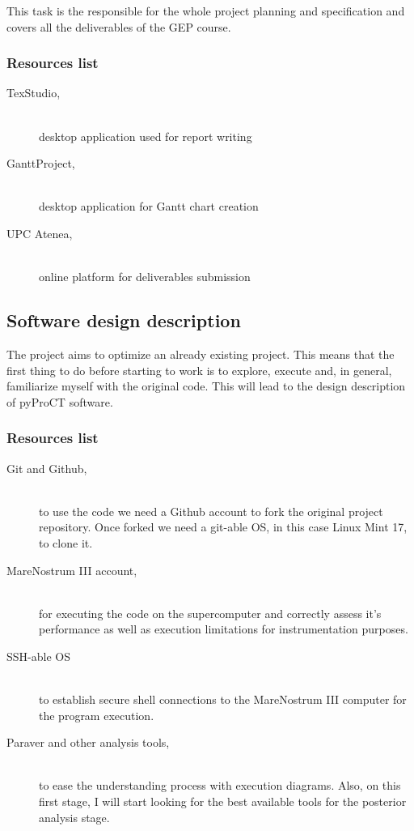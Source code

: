 This task is the responsible for the whole project planning and specification and covers all the deliverables of the GEP course. 

\subsubsection{Resources list}

\begin{description}
\item [TexStudio,] \hfill \\ desktop application used for report writing
\item [GanttProject,] \hfill \\ desktop application for Gantt chart creation
\item [UPC Atenea,] \hfill \\ online platform for deliverables submission
\end{description}

\subsection{Software design description}

The project aims to optimize an already existing project. This means that the first thing to do before starting to work is to explore, execute and, in general, familiarize myself with the original code. This will lead to the design description of pyProCT software. 

\subsubsection{Resources list}
\label{subsec:familiarresources}

\begin{description}
\item [Git and Github,] \hfill \\ to use the code we need a Github account to fork the original project repository. Once forked we need a git-able OS, in this case Linux Mint 17, to clone it. 
\item [MareNostrum III account,] \hfill \\ for executing the code on the supercomputer and correctly assess it's performance as well as execution limitations for instrumentation purposes.
\item [SSH-able OS] \hfill \\ to establish secure shell connections to the MareNostrum III computer for the program execution.
\item [Paraver and other analysis tools,] \hfill \\ to ease the understanding process with execution diagrams. Also, on this first stage, I will start looking for the best available tools for the posterior analysis stage.

\end{description}


